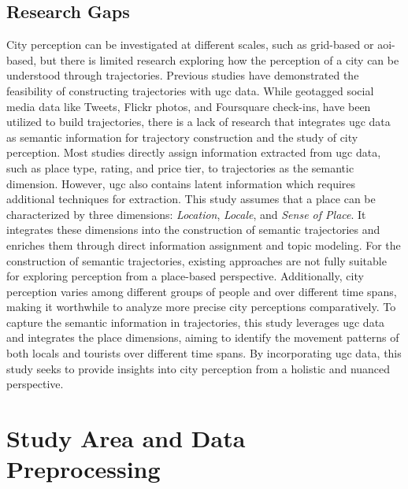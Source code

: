 \documentclass{article}
\theoremstyle{remark}
\begin{document}
\subsection{Research Gaps}
City perception can be investigated at different scales, such as grid-based or \acrshort{aoi}-based, but there is limited research exploring how the perception of a city can be understood through trajectories. Previous studies have demonstrated the feasibility of constructing trajectories with \acrshort{ugc} data. While geotagged social media data like Tweets, Flickr photos, and Foursquare check-ins, have been utilized to build trajectories, there is a lack of research that integrates \acrshort{ugc} data as semantic information for trajectory construction and the study of city perception. Most studies directly assign information extracted from \acrshort{ugc} data, such as place type, rating, and price tier, to trajectories as the semantic dimension. However, \acrshort{ugc} also contains latent information which requires additional techniques for extraction. This study assumes that a place can be characterized by three dimensions: \textit{Location}, \textit{Locale}, and \textit{Sense of Place}. It integrates these dimensions into the construction of semantic trajectories and enriches them through direct information assignment and topic modeling. For the construction of semantic trajectories, existing approaches are not fully suitable for exploring perception from a place-based perspective. Additionally, city perception varies among different groups of people and over different time spans, making it worthwhile to analyze more precise city perceptions comparatively. To capture the semantic information in trajectories, this study leverages \acrshort{ugc} data and integrates the place dimensions, aiming to identify the movement patterns of both locals and tourists over different time spans. By incorporating \acrshort{ugc} data, this study seeks to provide insights into city perception from a holistic and nuanced perspective.

\clearpage

\section{Study Area and Data Preprocessing}
\end{document}
